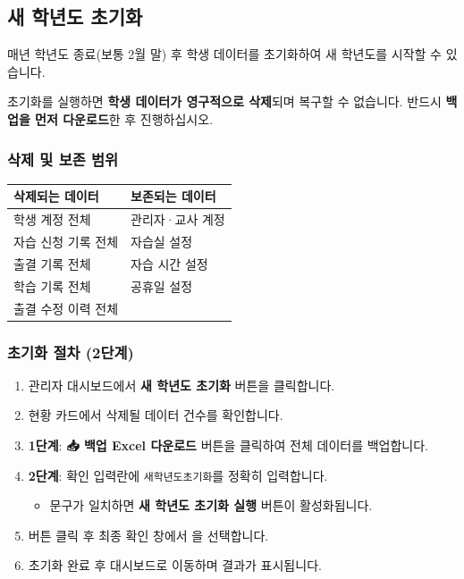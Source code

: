 \documentclass[a4paper,12pt]{article}
\newcommand{\menu}[1]{\textcolor{primary}{\textbf{#1}}}
\newcommand{\key}[1]{\fbox{\small\texttt{#1}}}
\begin{document}
\subsection{새 학년도 초기화}

매년 학년도 종료(보통 2월 말) 후 학생 데이터를 초기화하여 새 학년도를 시작할 수 있습니다.

\begin{warnbox}
  초기화를 실행하면 \textbf{학생 데이터가 영구적으로 삭제}되며 복구할 수 없습니다.
  반드시 \textbf{백업을 먼저 다운로드}한 후 진행하십시오.
\end{warnbox}

\subsubsection{삭제 및 보존 범위}

\begin{center}
\begin{tabular}{ll}
\toprule
\textbf{삭제되는 데이터} & \textbf{보존되는 데이터} \\
\midrule
학생 계정 전체 & 관리자·교사 계정 \\
자습 신청 기록 전체 & 자습실 설정 \\
출결 기록 전체 & 자습 시간 설정 \\
학습 기록 전체 & 공휴일 설정 \\
출결 수정 이력 전체 & \\
\bottomrule
\end{tabular}
\end{center}

\subsubsection{초기화 절차 (2단계)}

\begin{enumerate}[leftmargin=1.5em]
    \item 관리자 대시보드에서 \menu{새 학년도 초기화} 버튼을 클릭합니다.
    \item 현황 카드에서 삭제될 데이터 건수를 확인합니다.
    \item \textbf{1단계}: \menu{📥 백업 Excel 다운로드} 버튼을 클릭하여 전체 데이터를 백업합니다.
    \item \textbf{2단계}: 확인 입력란에 \texttt{새학년도초기화}를 정확히 입력합니다.
    \begin{itemize}
        \item 문구가 일치하면 \menu{새 학년도 초기화 실행} 버튼이 활성화됩니다.
    \end{itemize}
    \item 버튼 클릭 후 최종 확인 창에서 \key{확인}을 선택합니다.
    \item 초기화 완료 후 대시보드로 이동하며 결과가 표시됩니다.
\end{enumerate}
\end{document}

